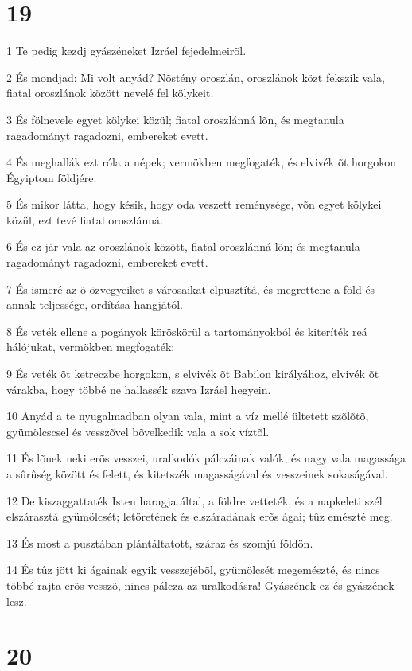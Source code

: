 \chapter{19}

\par 1 Te pedig kezdj gyászéneket Izráel fejedelmeirõl.
\par 2 És mondjad: Mi volt anyád? Nõstény oroszlán, oroszlánok közt fekszik vala, fiatal oroszlánok között nevelé fel kölykeit.
\par 3 És fölnevele egyet kölykei közül; fiatal oroszlánná lõn, és megtanula ragadományt ragadozni, embereket evett.
\par 4 És meghallák ezt róla a népek; vermökben megfogaték, és elvivék õt horgokon Égyiptom földjére.
\par 5 És mikor látta, hogy késik, hogy oda veszett reménysége, võn egyet kölykei közül, ezt tevé fiatal oroszlánná.
\par 6 És ez jár vala az oroszlánok között, fiatal oroszlánná lõn; és megtanula ragadományt ragadozni, embereket evett.
\par 7 És ismeré az õ özvegyeiket s városaikat elpusztítá, és megrettene a föld és annak teljessége, ordítása hangjától.
\par 8 És veték ellene a pogányok köröskörül a tartományokból és kiteríték reá hálójukat, vermökben megfogaték;
\par 9 És veték õt ketreczbe horgokon, s elvivék õt Babilon királyához, elvivék õt várakba, hogy többé ne hallassék szava Izráel hegyein.
\par 10 Anyád a te nyugalmadban olyan vala, mint a víz mellé ültetett szõlõtõ, gyümölcscsel és vesszõvel bõvelkedik vala a sok víztõl.
\par 11 És lõnek neki erõs vesszei, uralkodók pálczáinak valók, és nagy vala magassága a sûrûség között és felett, és kitetszék magasságával és vesszeinek sokaságával.
\par 12 De kiszaggattaték Isten haragja által, a földre vetteték, és a napkeleti szél elszárasztá gyümölcsét; letöretének és elszáradának erõs ágai; tûz emészté meg.
\par 13 És most a pusztában plántáltatott, száraz és szomjú földön.
\par 14 És tûz jött ki ágainak egyik vesszejébõl, gyümölcsét megemészté, és nincs többé rajta erõs vesszõ, nincs pálcza az uralkodásra! Gyászének ez és gyászének lesz.

\chapter{20}


